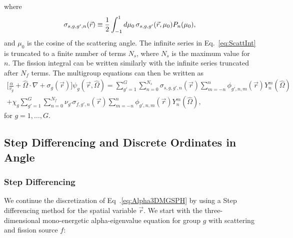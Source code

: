 where
\begin{equation}
	\sigma_{s,g,g',n}(\vec{r}) \equiv \frac{1}{2} \int_{-1}^{1} \mathop{}\!d \mu_{0} \, \sigma_{s,g,g'}(\vec{r},\mu_{0}) P_{n}(\mu_{0}),
\end{equation}
and $\mu_{0}$ is the cosine of the scattering angle. The infinite series in Eq.~\ref{eq:ScattInt} is truncated to a finite number of terms $N_{s}$, where $N_{s}$ is the maximum value for $n$. The fission integral can be written similarly with the infinite series truncated after $N_{f}$ terms. The multigroup equations can then be written as
\begin{multline}
	\bigg [ \frac{\alpha}{v_{g}} + \hat{\Omega} \cdot \nabla + \sigma_{g}(\vec{r}) \bigg ] \psi_{g}(\vec{r},\hat{\Omega}) = \sum_{g'=1}^{G} \sum_{n=0}^{N_{s}} \sigma_{s,g,g',n}(\vec{r}) \sum_{m=-n}^{n} \phi_{g',n,m}(\vec{r}) Y_{n}^{m}(\hat{\Omega}) \\ + \chi_{g} \sum_{g'=1}^{G} \sum_{n=0}^{N_{f}} \nu_{g'} \sigma_{f,g',n}(\vec{r}) \sum_{m=-n}^{n} \phi_{g',n,m}(\vec{r}) Y_{n}^{m}(\hat{\Omega}), 
	\label{eq:Alpha3DMGSPH}
\end{multline}
for $g = 1, \dots, G$.

\subsection{Step Differencing and Discrete Ordinates in Angle}

\subsubsection{Step Differencing}

We continue the discretization of Eq~.\ref{eq:Alpha3DMGSPH} by using a Step differencing method \cite{lewis_computational_1984} for the spatial variable $\vec{r}$. We start with the three-dimensional mono-energetic alpha-eigenvalue equation for group $g$ with scattering and fission source $f$:

